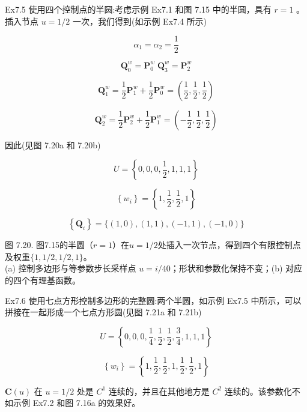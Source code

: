 \documentclass[../main.tex]{subfiles}
\begin{document}
Ex7.5 使用四个控制点的半圆:考虑示例 Ex7.1 和图 7.15 中的半圆，具有 \(r = 1\) 。插入节点 \(u = 1/2\) 一次，我们得到(如示例 Ex7.4 所示)

\[
{\alpha }_{1} = {\alpha }_{2} = \frac{1}{2}
\]

\[
{\mathbf{Q}}_{0}^{w} = {\mathbf{P}}_{0}^{w}\;{\mathbf{Q}}_{3}^{w} = {\mathbf{P}}_{2}^{w}
\]

\[
{\mathbf{Q}}_{1}^{w} = \frac{1}{2}{\mathbf{P}}_{1}^{w} + \frac{1}{2}{\mathbf{P}}_{0}^{w} = \left( {\frac{1}{2},\frac{1}{2},\frac{1}{2}}\right)
\]

\[
{\mathbf{Q}}_{2}^{w} = \frac{1}{2}{\mathbf{P}}_{2}^{w} + \frac{1}{2}{\mathbf{P}}_{1}^{w} = \left( {-\frac{1}{2},\frac{1}{2},\frac{1}{2}}\right)
\]

因此(见图 7.20a 和 7.20b)

\[
U = \left\{  {0,0,0,\frac{1}{2},1,1,1}\right\}
\]

\[
\left\{  {w}_{i}\right\}   = \left\{  {1,\frac{1}{2},\frac{1}{2},1}\right\}
\]

\[
\left\{  {\mathbf{Q}}_{i}\right\}   = \{ \left( {1,0}\right) ,\left( {1,1}\right) ,\left( {-1,1}\right) ,\left( {-1,0}\right) \}
\]

\begin{center}
\begin{minipage}{32cm}
\vspace*{.6\baselineskip}
\centering
{}
\par\smallskip
图 7.20. 图7.15的半圆（$r=1$）在$u=1/2$处插入一次节点，得到四个有限控制点及权重$\{1,1/2,1/2,1\}$。\\
(a) 控制多边形与等参数步长采样点 $u=i/40$；形状和参数化保持不变；(b) 对应的四个有理基函数。
\end{minipage}
\end{center}

Ex7.6 使用七点方形控制多边形的完整圆:两个半圆，如示例 Ex7.5 中所示，可以拼接在一起形成一个七点方形圆(见图 7.21a 和 7.21b)

\[
U = \left\{  {0,0,0,\frac{1}{4},\frac{1}{2},\frac{1}{2},\frac{3}{4},1,1,1}\right\}
\]

\[
\left\{  {w}_{i}\right\}   = \left\{  {1,\frac{1}{2},\frac{1}{2},1,\frac{1}{2},\frac{1}{2},1}\right\}
\]



\(\mathbf{C}\left( u\right)\) 在 \(u = 1/2\) 处是 \({C}^{1}\) 连续的，并且在其他地方是 \({C}^{2}\) 连续的。该参数化不如示例 Ex7.2 和图 7.16a 的效果好。
\end{document}
